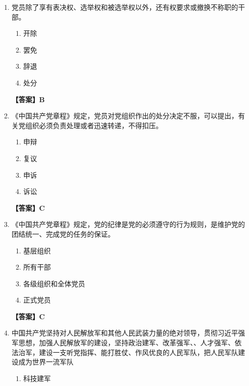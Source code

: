 \documentclass[UTF8,11pt,a4paper]{ctexart}
\begin{document}
\begin{enumerate}[label=\textbf{\arabic*.}, leftmargin=2.5em, itemsep=0.7em]
\begin{enumerate}[label=\Alph*., leftmargin=2em, itemsep=0.1em, topsep=0.15em]
\item ②③
\item ①④
\item ③④
\end{enumerate}
\textbf{【答案】B}
\item 党员除了享有表决权、选举权和被选举权以外，还有权要求\allowbreak\underline{\hspace{4em}}或撤换不称职的干部。
\begin{enumerate}[label=\Alph*., leftmargin=2em, itemsep=0.1em, topsep=0.15em]
\item 开除
\item 罢免
\item 辞退
\item 处分
\end{enumerate}
\textbf{【答案】B}
\item 《中国共产党章程》规定，党员对党组织作出的处分决定不服，可以提出\allowbreak\underline{\hspace{4em}}，有关党组织必须负责处理或者迅速转递，不得扣压。
\begin{enumerate}[label=\Alph*., leftmargin=2em, itemsep=0.1em, topsep=0.15em]
\item 申辩
\item 复议
\item 申诉
\item 诉讼
\end{enumerate}
\textbf{【答案】C}
\item 《中国共产党章程》规定，党的纪律是党的\allowbreak\underline{\hspace{4em}}必须遵守的行为规则，是维护党的团结统一、完成党的任务的保证。
\begin{enumerate}[label=\Alph*., leftmargin=2em, itemsep=0.1em, topsep=0.15em]
\item 基层组织
\item 所有干部
\item 各级组织和全体党员
\item 正式党员
\end{enumerate}
\textbf{【答案】C}
\item 中国共产党坚持对人民解放军和其他人民武装力量的绝对领导，贯彻习近平强军思想，加强人民解放军的建设，坚持政治建军、改革强军、\allowbreak\underline{\hspace{4em}}、人才强军、依法治军，建设一支听党指挥、能打胜仗、作风优良的人民军队，把人民军队建设成为世界一流军队
\begin{enumerate}[label=\Alph*., leftmargin=2em, itemsep=0.1em, topsep=0.15em]
\item 科技建军

\end{enumerate}
\end{enumerate}
\end{document}
